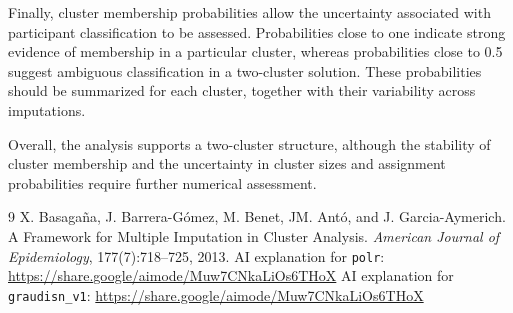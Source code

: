\documentclass[10pt,a4paper,twoside]{article}\usepackage[]{graphicx}\usepackage[]{xcolor}
\begin{document}
Finally, cluster membership probabilities allow the
uncertainty associated with participant classification
to be assessed. Probabilities close to one indicate
strong evidence of membership in a particular cluster,
whereas probabilities close to 0.5 suggest ambiguous
classification in a two-cluster solution. These probabilities
should be summarized for each cluster, together with their
variability across imputations.

Overall, the analysis supports a two-cluster structure,
although the stability of cluster membership and the
uncertainty in cluster sizes and assignment probabilities
require further numerical assessment.



\newpage
\begin{thebibliography}{9}
 X. Basagaña, J. Barrera-Gómez, M. Benet, JM. Antó, and J. Garcia-Aymerich. A Framework for Multiple Imputation in Cluster Analysis. \emph{American Journal of Epidemiology}, 177(7):718–725, 2013.
 AI explanation for \texttt{polr}: \textcolor{blue}{\href{https://share.google/aimode/Muw7CNkaLiOs6THoX}{https://share.google/aimode/Muw7CNkaLiOs6THoX}}
 AI explanation for \texttt{graudisn\_v1}: \textcolor{blue}{\href{https://share.google/aimode/Muw7CNkaLiOs6THoX}{https://share.google/aimode/Muw7CNkaLiOs6THoX}}
\end{thebibliography}
\end{document}
